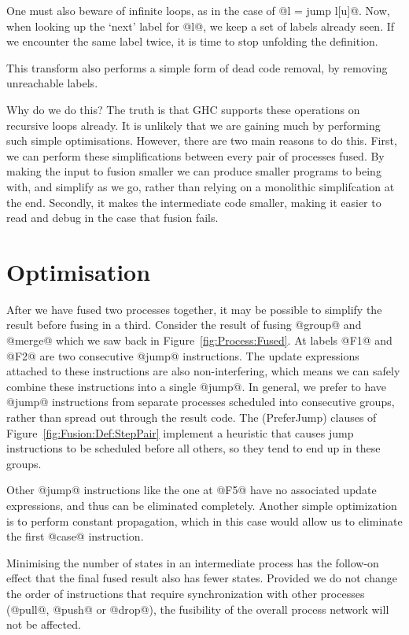 One must also beware of infinite loops, as in the case of @l = jump l[u]@.
Now, when looking up the `next' label for @l@, we keep a set of labels already seen.
If we encounter the same label twice, it is time to stop unfolding the definition.

This transform also performs a simple form of dead code removal, by removing unreachable labels.

Why do we do this?
The truth is that GHC supports these operations on recursive loops already.
It is unlikely that we are gaining much by performing such simple optimisations.
However, there are two main reasons to do this.
First, we can perform these simplifications between every pair of processes fused.
By making the input to fusion smaller we can produce smaller programs to being with, and simplify as we go, rather than relying on a monolithic simplifcation at the end.
Secondly, it makes the intermediate code smaller, making it easier to read and debug in the case that fusion fails.



\section{Optimisation}
\label{s:Optimisation}
After we have fused two processes together, it may be possible to simplify the result before fusing in a third. Consider the result of fusing @group@ and @merge@ which we saw back in Figure~\ref{fig:Process:Fused}. At labels @F1@ and @F2@ are two consecutive @jump@ instructions.
The update expressions attached to these instructions are also non-interfering, which means we can safely combine these instructions into a single @jump@.
In general, we prefer to have @jump@ instructions from separate processes scheduled into consecutive groups, rather than spread out through the result code.
The (PreferJump) clauses of Figure~\ref{fig:Fusion:Def:StepPair} implement a heuristic that causes jump instructions to be scheduled before all others, so they tend to end up in these groups.

Other @jump@ instructions like the one at @F5@ have no associated update expressions, and thus can be eliminated completely. Another simple optimization is to perform constant propagation, which in this case would allow us to eliminate the first @case@ instruction. 

Minimising the number of states in an intermediate process has the follow-on effect that the final fused result also has fewer states. Provided we do not change the order of instructions that require synchronization with other processes (@pull@, @push@ or @drop@), the fusibility of the overall process network will not be affected.

